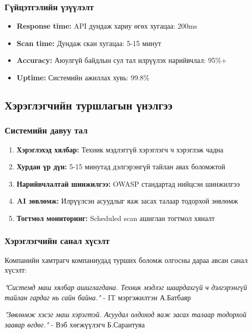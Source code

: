 \documentclass[main.tex]{subfiles}
\begin{document}
\subsubsection{Гүйцэтгэлийн үзүүлэлт}
\begin{itemize}
    \item \textbf{Response time:} API дундаж хариу өгөх хугацаа: 200ms
    \item \textbf{Scan time:} Дундаж скан хугацаа: 5-15 минут
    \item \textbf{Accuracy:} Аюулгүй байдлын сул тал илрүүлэх нарийвчлал: 95\%+
    \item \textbf{Uptime:} Системийн ажиллах хувь: 99.8\%
\end{itemize}

\subsection{Хэрэглэгчийн туршлагын үнэлгээ}

\subsubsection{Системийн давуу тал}
\begin{enumerate}
    \item \textbf{Хэрэглэхэд хялбар:} Техник мэдлэггүй хэрэглэгч ч хэрэглэж чадна
    \item \textbf{Хурдан үр дүн:} 5-15 минутад дэлгэрэнгүй тайлан авах боломжтой
    \item \textbf{Нарийвчлалтай шинжилгээ:} OWASP стандартад нийцсэн шинжилгээ
    \item \textbf{AI зөвлөмж:} Илрүүлсэн асуудлыг яаж засах талаар тодорхой зөвлөмж
    \item \textbf{Тогтмол мониторинг:} Scheduled scan ашиглан тогтмол хяналт
\end{enumerate}

\subsubsection{Хэрэглэгчийн санал хүсэлт}
Компанийн хамтрагч компаниудад турших боломж олгосны дараа авсан санал хүсэлт:

\textit{"Системд маш хялбар ашиглагдана. Техник мэдлэг шаардахгүй ч дэлгэрэнгүй тайлан гардаг нь сайн байна."} 
- IT мэргэжилтэн А.Батбаяр

\textit{"Зөвлөмж хэсэг маш хэрэгтэй. Асуудал олдоход яаж засах талаар тодорхой заавар өгдөг."}
- Вэб хөгжүүлэгч Б.Сарантуяа
\end{document}

